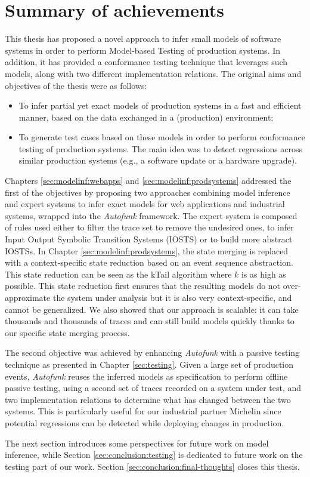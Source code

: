 \section{Summary of achievements}

This thesis has proposed a novel approach to infer small models
of software systems in order to perform Model-based Testing of
production systems. In addition, it has provided a conformance
testing technique that leverages such models, along with two
different implementation relations. The original aims and
objectives of the thesis were as follows:

\begin{itemize}
    \item To infer partial yet exact models of production systems
        in a fast and efficient manner, based on the data
        exchanged in a (production) environment;

    \item To generate test cases based on these models in order
        to perform conformance testing of production systems. The
        main idea was to detect regressions across similar
        production systems (e.g., a software update or a hardware
        upgrade).
\end{itemize}

Chapters \ref{sec:modelinf:webapps} and
\ref{sec:modelinf:prodsystems} addressed the first of the
objectives by proposing two approaches combining model inference
and expert systems to infer exact models for web applications and
industrial systems, wrapped into the \textit{Autofunk} framework.
The expert system is composed of rules used either to filter the
trace set to remove the undesired ones, to infer Input Output
Symbolic Transition Systems (IOSTS) or to build more abstract
IOSTSs. In Chapter \ref{sec:modelinf:prodsystems}, the state
merging is replaced with a context-specific state reduction based
on an event sequence abstraction. This state reduction can be
seen as the kTail algorithm \cite{5009015} where $k$ is as high
as possible.  This state reduction first ensures that the
resulting models do not over-approximate the system under
analysis but it is also very context-specific, and cannot be
generalized. We also showed that our approach is scalable: it can
take thousands and thousands of traces and can still build models
quickly thanks to our specific state merging process.

The second objective was achieved by enhancing \textit{Autofunk}
with a passive testing technique as presented in Chapter
\ref{sec:testing}. Given a large set of production events,
\textit{Autofunk} reuses the inferred models as specification to
perform offline passive testing, using a second set of traces
recorded on a system under test, and two implementation relations
to determine what has changed between the two systems. This is
particularly useful for our industrial partner Michelin since
potential regressions can be detected while deploying changes in
production.

The next section introduces some perspectives for future work on
model inference, while Section \ref{sec:conclusion:testing} is
dedicated to future work on the testing part of our work. Section
\ref{sec:conclusion:final-thoughts} closes this thesis.
